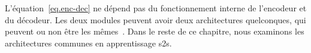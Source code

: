 L'équation~\ref{eq.enc-dec} ne dépend pas du fonctionnement interne de l'encodeur et du décodeur.
Les deux modules peuvent avoir deux architectures quelconques, qui peuvent ou non être les mêmes~\cite{deep-nmt-survey}.
Dans le reste de ce chapitre, nous examinons les architectures communes en apprentissage \gls{s2s}.


